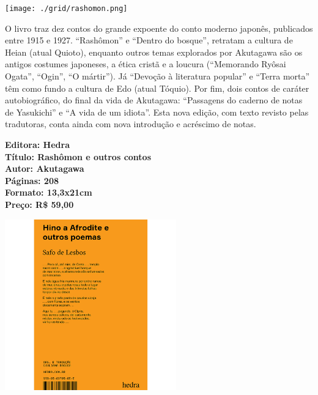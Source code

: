\pagebreak


\begin{center}
\hspace*{-3.6cm}
\hspace*{3.1cm}\texttt{[image: ./grid/rashomon.png]}
\end{center}

\hspace*{-7cm}\hrulefill\hspace*{-7cm}

\medskip

\noindent{}O livro traz dez contos do grande expoente do conto moderno japonês, publicados entre 1915 e 1927. ``Rashômon'' e ``Dentro do bosque'', retratam a cultura de Heian (atual Quioto), enquanto outros temas explorados por Akutagawa são os antigos costumes japoneses, a ética cristã e a loucura (``Memorando Ryôsai Ogata'', ``Ogin'', ``O mártir''). Já ``Devoção à literatura popular'' e ``Terra morta'' têm como fundo a cultura de Edo (atual Tóquio). Por fim, dois contos de caráter autobiográfico, do final da vida de Akutagawa: ``Passagens do caderno de notas de Yasukichi'' e ``A vida de um idiota''. Esta nova edição, com texto revisto pelas tradutoras, conta ainda com nova introdução e acréscimo de notas.
\vfill

\noindent\begin{minipage}[c]{1\linewidth}
{\small\textbf{
\hspace*{-.1cm}Editora: Hedra\\
Título: Rashômon e outros contos\\
Autor: Akutagawa\\ 
Páginas: 208\\
Formato: 13,3x21cm\\
Preço: R\$ 59,00\\
}}
\end{minipage}

\pagebreak


\begin{center}
\hspace*{-3.6cm}
\hspace*{3.1cm}\includegraphics[width=74mm]{./grid/safo.png}
\end{center}

